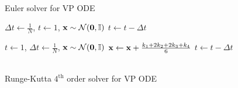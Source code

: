 \begin{figure}[H]
    \centering
    \begin{minipage}[t]{0.48\textwidth}
        \begin{algorithm}[H]
            \caption{\\Euler solver for VP ODE}
            \label{alg:euler}
            \footnotesize
            \begin{algorithmic}[1]
                \vspace{2pt}
                \State $\Delta t \gets \frac{1}{N}$, $t \gets 1$, $\mathbf{x} \sim \mathcal{N}(\mathbf{0}, \mathbb{I})$
                 \label{line:euler}
                \State $t \gets t - \Delta t$
                \EndWhile \\
                \Return{$\x$}
                \vspace{2pt}
            \end{algorithmic}
        \end{algorithm}
    \end{minipage}%
    \hspace{0.04\textwidth}%
    \begin{minipage}[t]{0.48\textwidth}
        \begin{algorithm}[H]
            \caption{\\Runge-Kutta $4^\text{th}$ order solver for VP ODE}
            \label{alg:runge_kutta}
            \footnotesize
            \begin{algorithmic}[1]
                \vspace{2pt}
                \State $t \gets 1$, $\Delta t \gets \frac{1}{N}$, $\mathbf{x} \sim \mathcal{N}(\mathbf{0}, \mathbb{I})$
                 \label{line:rk_start}
                \State $\mathbf{x} \gets \mathbf{x} + \frac{k_1 + 2  k_2 + 2  k_3 +  k_4}{6}$ \label{line:rk_end}
                \State $t \gets t - \Delta t$
                \EndWhile \\
                \Return{$\x$}
                \vspace{2pt}
            \end{algorithmic}
        \end{algorithm}
    \end{minipage}
\end{figure}

